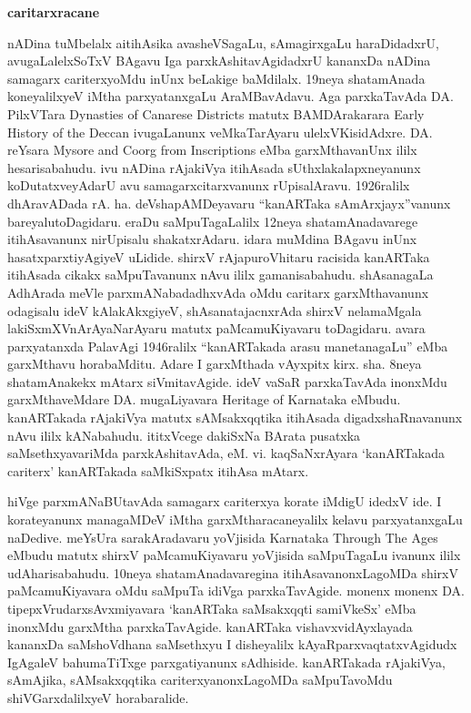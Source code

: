 \documentclass[11pt,a4size]{article}
\begin{document}
\medskip
\noindent
\textbf{\Large caritarxracane}
\smallskip

nADina tuMbelalx aitihAsika avasheVSagaLu, sAmagirxgaLu haraDidadxrU,
avugaLalelxSoTxV BAgavu Iga parxkAshitavAgidadxrU kananxDa nADina
samagarx cariterxyoMdu inUnx beLakige baMdilalx. 19neya shatamAnada
koneyalilxyeV iMtha parxyatanxgaLu AraMBavAdavu. Aga parxkaTavAda
DA. PilxVTara {\rm Dynasties of Canarese Districts} matutx
BAMDArakarara {\rm Early History of the Deccan} ivugaLanunx
veMkaTarAyaru ulelxVKisidAdxre. DA. reYsara {\rm Mysore and Coorg from
  Inscriptions} eMba garxMthavanUnx ililx hesarisabahudu. ivu nADina
rAjakiVya itihAsada sUthxlakalapxneyanunx koDutatxveyAdarU avu
samagarxcitarxvanunx rUpisalAravu. 1926ralilx dhAravADada
rA. ha. deVshapAMDeyavaru ``kanARTaka sAmArxjayx''vanunx
bareyalutoDagidaru. eraDu saMpuTagaLalilx 12neya shatamAnadavarege
itihAsavanunx nirUpisalu shakatxrAdaru. idara muMdina BAgavu inUnx
hasatxparxtiyAgiyeV uLidide. shirxV rAjapuroVhitaru racisida kanARTaka
itihAsada cikakx saMpuTavanunx nAvu ililx gamanisabahudu. shAsanagaLa
AdhArada meVle parxmANabadadhxvAda oMdu caritarx garxMthavanunx
odagisalu ideV kAlakAkxgiyeV, shAsanatajacnxrAda shirxV nelamaMgala
lakiSxmXVnArAyaNarAyaru matutx paMcamuKiyavaru toDagidaru. avara
parxyatanxda PalavAgi 1946ralilx ``kanARTakada arasu manetanagaLu''
eMba garxMthavu horabaMditu. Adare I garxMthada vAyxpitx
kirx. sha. 8neya shatamAnakekx mAtarx siVmitavAgide. ideV vaSaR
parxkaTavAda inonxMdu garxMthaveMdare DA. mugaLiyavara {\rm Heritage
  of Karnataka} eMbudu. kanARTakada rAjakiVya matutx sAMsakxqqtika
itihAsada digadxshaRnavanunx nAvu ililx kANabahudu. ititxVcege
dakiSxNa BArata pusatxka saMsethxyavariMda parxkAshitavAda,
eM. vi. kaqSaNxrAyara `kanARTakada cariterx' kanARTakada saMkiSxpatx
itihAsa mAtarx.

hiVge parxmANaBUtavAda samagarx cariterxya korate iMdigU idedxV ide. I
korateyanunx managaMDeV iMtha garxMtharacaneyalilx kelavu
parxyatanxgaLu naDedive. meYsUra sarakAradavaru yoVjisida {\rm
  Karnataka Through The Ages} eMbudu matutx shirxV paMcamuKiyavaru
yoVjisida saMpuTagaLu ivanunx ililx udAharisabahudu. 10neya
shatamAnadavaregina itihAsavanonxLagoMDa shirxV paMcamuKiyavara oMdu
saMpuTa idiVga parxkaTavAgide. monenx monenx
DA. tipepxVrudarxsAvxmiyavara `kanARTaka saMsakxqqti samiVkeSx' eMba
inonxMdu garxMtha parxkaTavAgide. kanARTaka vishavxvidAyxlayada
kananxDa saMshoVdhana saMsethxyu I disheyalilx
kAyaRparxvaqtatxvAgidudx IgAgaleV bahumaTiTxge parxgatiyanunx
sAdhiside. kanARTakada rAjakiVya, sAmAjika, sAMsakxqqtika
cariterxyanonxLagoMDa saMpuTavoMdu shiVGarxdalilxyeV horabaralide.
\end{document}

